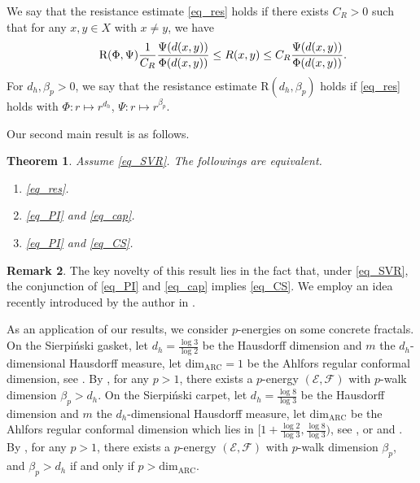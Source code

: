 \documentclass[11pt,a4paper]{article}
\numberwithin{equation}{section}
\theoremstyle{plain}
\newtheorem{theorem}{Theorem}[section]
\theoremstyle{definition}
\newtheorem{remark}[theorem]{Remark}
\begin{document}
We say that the resistance estimate \ref{eq_res} holds if there exists $C_R>0$ such that for any $x,y\in X$ with $x\ne y$, we have
\begin{equation*}\label{eq_res}\tag*{$\text{R}(\Phi,\Psi)$}
\frac{1}{C_R}\frac{\Psi(d(x,y))}{\Phi(d(x,y))}\le R(x,y)\le C_R\frac{\Psi(d(x,y))}{\Phi(d(x,y))}.
\end{equation*}
For $d_h, \beta_p>0$, we say that the resistance estimate \hypertarget{eq_Rdb}{$\text{R}(d_h,\beta_p)$} holds if \ref{eq_res} holds with $\Phi:r\mapsto r^{d_h}$, $\Psi:r\mapsto r^{\beta_p}$.

Our second main result is as follows.

\begin{theorem}\label{thm_equiv}
Assume \ref{eq_SVR}. The followings are equivalent.
\begin{enumerate}[label=(\arabic*)]
\item \ref{eq_res}.
\item \ref{eq_PI} and \ref{eq_cap}.
\item \ref{eq_PI} and \ref{eq_CS}.
\end{enumerate}
\end{theorem}

\begin{remark}
The key novelty of this result lies in the fact that, under \ref{eq_SVR}, the conjunction of \ref{eq_PI} and \ref{eq_cap} implies \ref{eq_CS}. We employ an idea recently introduced by the author in \cite{Yan25b}.
\end{remark}

As an application of our results, we consider $p$-energies on some concrete fractals. On the Sierpi\'nski gasket, let $d_h=\frac{\log3}{\log2}$ be the Hausdorff dimension and $m$ the $d_h$-dimensional Hausdorff measure, let $\mathrm{dim}_{\mathrm{ARC}}=1$ be the Ahlfors regular conformal dimension, see \cite{TW06,Car14}. By \cite{HPS04,CGQ22}, for any $p>1$, there exists a $p$-energy $(\mathcal{E},\mathcal{F})$ with $p$-walk dimension $\beta_p>d_h$. On the Sierpi\'nski carpet, let $d_h=\frac{\log8}{\log3}$ be the Hausdorff dimension and $m$ the $d_h$-dimensional Hausdorff measure, let $\mathrm{dim}_{\mathrm{ARC}}$ be the Ahlfors regular conformal dimension which lies in $[1+\frac{\log2}{\log3},\frac{\log8}{\log3})$, see \cite[Example 4.3.1]{MT10book}, or \cite{Tys00a} and \cite{KL04}. By \cite{Shi24,MS25}, for any $p>1$, there exists a $p$-energy $(\mathcal{E},\mathcal{F})$ with $p$-walk dimension $\beta_p$, and $\beta_p>d_h$ if and only if $p>\mathrm{dim}_{\mathrm{ARC}}$.
\end{document}
